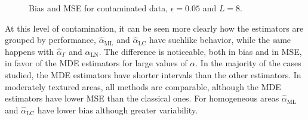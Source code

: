 \documentclass[twocolumn]{svjour3}
\begin{document}
\begin{figure}[hbt]
\centering
{}
\caption{Bias and MSE for contaminated data,  $\epsilon=0.05$ and $ L=8$.}\label{SesgoyECMConContL=8} 
\end{figure}

At this level of contamination, it can be seen more clearly how the estimators are grouped by performance, $\widehat{\alpha}_{\text{{ML}}}$ and $\widehat{\alpha}_{\text{{LC}}}$ have suchlike behavior, while the same happens with $\widehat{\alpha}_{\Gamma}$ and $\widehat{\alpha}_{\text{{LN}}}$.  
The difference is noticeable, both in bias and in MSE, in favor of the MDE estimators for large values of $\alpha$. 
In the majority of the cases studied, the MDE estimators have shorter intervals than the other estimators. 
In moderately textured areas, all methods are comparable, although the MDE estimators have lower MSE than the classical ones. 
For homogeneous areas $\widehat{\alpha}_{\text{{ML}}}$ and $\widehat{\alpha}_{\text{{LC}}}$ have lower bias although greater variability.
\end{document}

